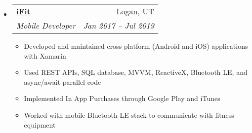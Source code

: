 \documentclass[letterpaper,11pt]{article}
\makeatletter
\newcommand{\resitem}[1]{\item #1 \vspace{-2pt}}
\newcommand{\ressubheading}[4]{
\begin{tabular*}{6.5in}{l@{\extracolsep{\fill}}r}
		\textbf{#1} & #2 \\
		\textit{#3} & \textit{#4} \\
\end{tabular*}\vspace{-6pt}}
\makeatother
\begin{document}
\begin{itemize}
{\begin{itemize}
			\end{itemize}
		}
		\item 
		\ressubheading{\href{http://www.ifit.com}{iFit}}{Logan, UT}{Mobile Developer}{Jan 2017 -- Jul 2019}
		{ \footnotesize
			\begin{itemize}
				\resitem{Developed and maintained cross platform (Android and iOS) applications with Xamarin}
				\resitem{Used REST APIs, SQL database, MVVM, ReactiveX, Bluetooth LE, and async/await parallel code}
				\resitem{Implemented In App Purchases through Google Play and iTunes}
				    \resitem{Worked with mobile Bluetooth LE stack to communicate with fitness equipment}
			\end{itemize}
		}

\end{itemize}
\end{document}
